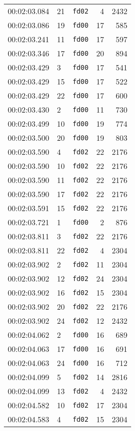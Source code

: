 \documentclass{article}
\begin{document}
\begin{longtable}{lllrr}
00:02:03.084 & 21 & \texttt{fd02} & 4 & 2432 \\
00:02:03.086 & 19 & \texttt{fd00} & 17 & 585 \\
00:02:03.241 & 11 & \texttt{fd00} & 17 & 597 \\
00:02:03.346 & 17 & \texttt{fd00} & 20 & 894 \\
00:02:03.429 & 3 & \texttt{fd00} & 17 & 541 \\
00:02:03.429 & 15 & \texttt{fd00} & 17 & 522 \\
00:02:03.429 & 22 & \texttt{fd00} & 17 & 600 \\
00:02:03.430 & 2 & \texttt{fd00} & 11 & 730 \\
00:02:03.499 & 10 & \texttt{fd00} & 19 & 774 \\
00:02:03.500 & 20 & \texttt{fd00} & 19 & 803 \\
00:02:03.590 & 4 & \texttt{fd02} & 22 & 2176 \\
00:02:03.590 & 10 & \texttt{fd02} & 22 & 2176 \\
00:02:03.590 & 11 & \texttt{fd02} & 22 & 2176 \\
00:02:03.590 & 17 & \texttt{fd02} & 22 & 2176 \\
00:02:03.591 & 15 & \texttt{fd02} & 22 & 2176 \\
00:02:03.721 & 1 & \texttt{fd00} & 2 & 876 \\
00:02:03.811 & 3 & \texttt{fd02} & 22 & 2176 \\
00:02:03.811 & 22 & \texttt{fd02} & 4 & 2304 \\
00:02:03.902 & 2 & \texttt{fd02} & 11 & 2304 \\
00:02:03.902 & 12 & \texttt{fd02} & 24 & 2304 \\
00:02:03.902 & 16 & \texttt{fd02} & 15 & 2304 \\
00:02:03.902 & 20 & \texttt{fd02} & 22 & 2176 \\
00:02:03.902 & 24 & \texttt{fd02} & 12 & 2432 \\
00:02:04.062 & 2 & \texttt{fd00} & 16 & 689 \\
00:02:04.063 & 17 & \texttt{fd00} & 16 & 691 \\
00:02:04.063 & 24 & \texttt{fd00} & 16 & 712 \\
00:02:04.099 & 5 & \texttt{fd02} & 14 & 2816 \\
00:02:04.099 & 13 & \texttt{fd02} & 4 & 2432 \\
00:02:04.582 & 10 & \texttt{fd02} & 17 & 2304 \\
00:02:04.583 & 4 & \texttt{fd02} & 15 & 2304 \\

\end{longtable}
\end{document}
